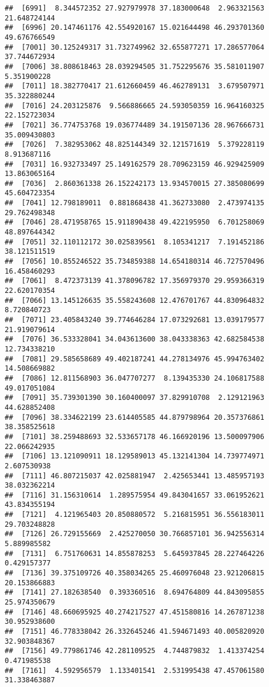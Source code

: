 \documentclass[
]{article}
\begin{document}
\begin{verbatim}
##  [6991]  8.344572352 27.927979978 37.183000648  2.963321563 21.648724144
##  [6996] 20.147461176 42.554920167 15.021644498 46.293701360 49.676766549
##  [7001] 30.125249317 31.732749962 32.655877271 17.286577064 37.744672934
##  [7006] 38.808618463 28.039294505 31.752295676 35.581011907  5.351900228
##  [7011] 18.382770417 21.612660459 46.462789131  3.679507971 35.322880244
##  [7016] 24.203125876  9.566886665 24.593050359 16.964160325 22.152723034
##  [7021] 36.774753768 19.036774489 34.191507136 28.967666731 35.009430803
##  [7026]  7.382953062 48.825144349 32.121571619  5.379228119  8.913687116
##  [7031] 16.932733497 25.149162579 28.709623159 46.929425909 13.863065164
##  [7036]  2.860361338 26.152242173 13.934570015 27.385080699 45.604723354
##  [7041] 12.798189011  0.881868438 41.362733080  2.473974135 29.762498348
##  [7046] 28.471958765 15.911890438 49.422195950  6.701258069 48.897644342
##  [7051] 32.110112172 30.025839561  8.105341217  7.191452186 38.121511519
##  [7056] 10.855246522 35.734859388 14.654180314 46.727570496 16.458460293
##  [7061]  8.472373139 41.378096782 17.356979370 29.959366319 22.620170354
##  [7066] 13.145126635 35.558243608 12.476701767 44.830964832  8.720840723
##  [7071] 23.405843240 39.774646284 17.073292681 13.039179577 21.919079614
##  [7076] 36.533328041 34.043613600 38.043338363 42.682584538 12.734338210
##  [7081] 29.585658689 49.402187241 44.278134976 45.994763402 14.508669882
##  [7086] 12.811568903 36.047707277  8.139435330 24.106817588 49.017051084
##  [7091] 35.739301390 30.160400097 37.829910708  2.129121963 44.628852408
##  [7096] 38.334622199 23.614405585 44.879798964 20.357376861 38.358525618
##  [7101] 38.259488693 32.533657178 46.166920196 13.500097906 22.066242935
##  [7106] 13.121090911 18.129589013 45.132141304 14.739774971  2.607530938
##  [7111] 46.807215037 42.025881947  2.425653441 13.485957193 38.032362214
##  [7116] 31.156310614  1.289575954 49.843041657 33.061952621 43.834355194
##  [7121]  4.121965403 20.850880572  5.216815951 36.556183011 29.703248828
##  [7126] 26.729155669  2.425270050 30.766857101 36.942556314  5.889985582
##  [7131]  6.751760631 14.855878253  5.645937845 28.227464226  0.429157377
##  [7136] 39.375109726 40.358034265 25.460976048 23.921206815 20.153866883
##  [7141] 27.182638540  0.393360516  8.694764809 44.843095855 25.974350679
##  [7146] 48.660695925 40.274217527 47.451580816 14.267871238 30.952938600
##  [7151] 46.778338042 26.332645246 41.594671493 40.005820920 32.903848367
##  [7156] 49.779861746 42.281109525  4.744879832  1.413374254  0.471985538
##  [7161]  4.592956579  1.133401541  2.531995438 47.457061580 31.338463887

\end{verbatim}
\end{document}

